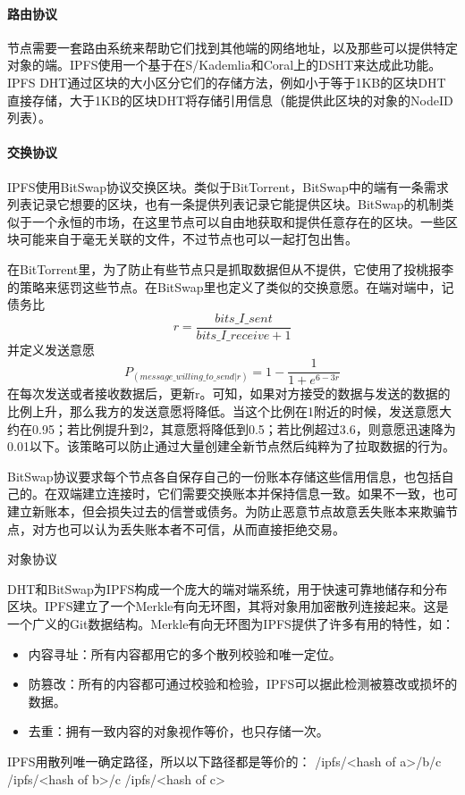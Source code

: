 \documentclass{ctexart}
\begin{document}
\paragraph{路由协议}
节点需要一套路由系统来帮助它们找到其他端的网络地址，以及那些可以提供特定对象的端。IPFS使用一个基于在S/Kademlia和Coral上的DSHT来达成此功能。IPFS DHT通过区块的大小区分它们的存储方法，例如小于等于1KB的区块DHT直接存储，大于1KB的区块DHT将存储引用信息（能提供此区块的对象的NodeID列表）。
\paragraph{交换协议}
IPFS使用BitSwap协议交换区块。类似于BitTorrent，BitSwap中的端有一条需求列表记录它想要的区块，也有一条提供列表记录它能提供区块。BitSwap的机制类似于一个永恒的市场，在这里节点可以自由地获取和提供任意存在的区块。一些区块可能来自于毫无关联的文件，不过节点也可以一起打包出售。

在BitTorrent里，为了防止有些节点只是抓取数据但从不提供，它使用了投桃报李的策略来惩罚这些节点。在BitSwap里也定义了类似的交换意愿。在端对端中，记债务比
\[
r = \frac{bits\_I\_sent}{bits\_I\_receive+1}
\]并定义发送意愿
\[ P_{(message\_willing\_to\_send|r)} = 1 - \frac{1}{1+e^{6-3r}}
\]
在每次发送或者接收数据后，更新r。可知，如果对方接受的数据与发送的数据的比例上升，那么我方的发送意愿将降低。当这个比例在1附近的时候，发送意愿大约在0.95；若比例提升到2，其意愿将降低到0.5；若比例超过3.6，则意愿迅速降为0.01以下。该策略可以防止通过大量创建全新节点然后纯粹为了拉取数据的行为。

BitSwap协议要求每个节点各自保存自己的一份账本存储这些信用信息，也包括自己的。在双端建立连接时，它们需要交换账本并保持信息一致。如果不一致，也可建立新账本，但会损失过去的信誉或债务。为防止恶意节点故意丢失账本来欺骗节点，对方也可以认为丢失账本者不可信，从而直接拒绝交易。

对象协议

DHT和BitSwap为IPFS构成一个庞大的端对端系统，用于快速可靠地储存和分布区块。IPFS建立了一个Merkle有向无环图，其将对象用加密散列连接起来。这是一个广义的Git数据结构。Merkle有向无环图为IPFS提供了许多有用的特性，如：
\begin{itemize}
	\item 内容寻址：所有内容都用它的多个散列校验和唯一定位。
	\item 防篡改：所有的内容都可通过校验和检验，IPFS可以据此检测被篡改或损坏的数据。
	\item 去重：拥有一致内容的对象视作等价，也只存储一次。
\end{itemize}
IPFS用散列唯一确定路径，所以以下路径都是等价的：
/ipfs/<hash of a>/b/c
/ipfs/<hash of b>/c
/ipfs/<hash of c>
\end{document}
